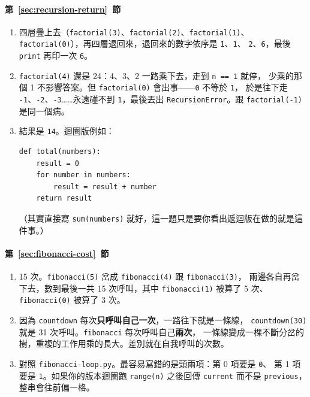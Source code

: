 \paragraph{第~\ref{sec:recursion-return}~節}
\begin{enumerate}
\item 四層疊上去（\texttt{factorial(3)}、\texttt{factorial(2)}、\texttt{factorial(1)}、
\texttt{factorial(0)}），再四層退回來，退回來的數字依序是 \texttt{1}、\texttt{1}、
\texttt{2}、\texttt{6}，最後 \texttt{print} 再印一次 \texttt{6}。
\item \texttt{factorial(4)} 還是 24：4、3、2 一路乘下去，走到 \texttt{n == 1} 就停，
少乘的那個 1 不影響答案。但 \texttt{factorial(0)} 會出事——\texttt{0} 不等於 \texttt{1}，
於是往下走 \texttt{-1}、\texttt{-2}、\texttt{-3}……永遠碰不到 \texttt{1}，最後丟出
\texttt{RecursionError}。跟 \texttt{factorial(-1)} 是同一個病。
\item 結果是 \texttt{14}。迴圈版例如：
\begin{verbatim}
def total(numbers):
    result = 0
    for number in numbers:
        result = result + number
    return result
\end{verbatim}
（其實直接寫 \texttt{sum(numbers)} 就好，這一題只是要你看出遞迴版在做的就是這件事。）
\end{enumerate}

\paragraph{第~\ref{sec:fibonacci-cost}~節}
\begin{enumerate}
\item 15 次。\texttt{fibonacci(5)} 岔成 \texttt{fibonacci(4)} 跟 \texttt{fibonacci(3)}，
兩邊各自再岔下去，數到最後一共 15 次呼叫，其中 \texttt{fibonacci(1)} 被算了 5 次、
\texttt{fibonacci(0)} 被算了 3 次。
\item 因為 \texttt{countdown} 每次\textbf{只呼叫自己一次}，一路往下就是一條線，
\texttt{countdown(30)} 就是 31 次呼叫。\texttt{fibonacci} 每次呼叫自己\textbf{兩次}，
一條線變成一棵不斷分岔的樹，重複的工作用乘的長大。差別就在自我呼叫的次數。
\item 對照 \texttt{fibonacci-loop.py}。最容易寫錯的是頭兩項：第 0 項要是 \texttt{0}、
第 1 項要是 \texttt{1}。如果你的版本迴圈跑 \texttt{range(n)} 之後回傳
\texttt{current} 而不是 \texttt{previous}，整串會往前偏一格。
\end{enumerate}

